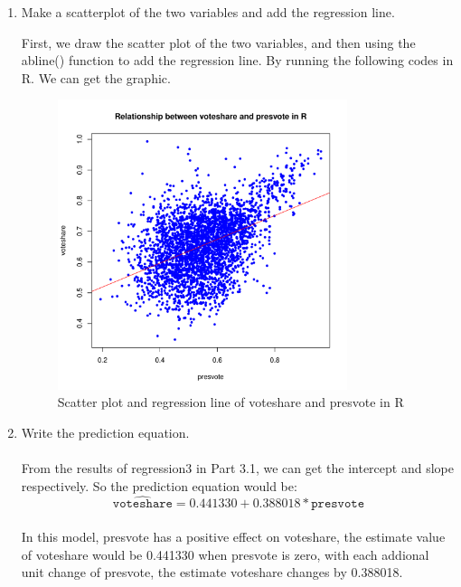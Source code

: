 \documentclass[12pt,letterpaper]{article}
\begin{document}
\begin{enumerate}
		\item Make a scatterplot of the two variables and add the regression line. 
		
		\noindent First, we draw the scatter plot of the two variables, and then using the abline() function to add the regression line. By running the following codes in R. We can get the graphic.
		
		
		
		\begin{figure}[h]
			\centering
			\includegraphics[width=0.8\textwidth]{Scatter plot and regression line of voteshare and presvote in R.pdf}
			\caption{Scatter plot and regression line of voteshare and presvote in R}
			\label{fig:pdf}
		\end{figure}
			\vspace{.15cm}
		
		\newpage	
		\item Write the prediction equation.\\
		\noindent \\From the results of regression3 in Part 3.1, we can get the intercept and slope respectively. So the prediction equation would be:\\  \[ \hat{\texttt{voteshare}}= 0.441330 + 0.388018*\texttt{presvote} \] \\ In this model, presvote has a positive effect on voteshare, the estimate value of voteshare would be 0.441330 when presvote is zero, with each addional unit change of presvote, the estimate voteshare changes by 0.388018.\\

	\end{enumerate}
	
\end{document}
